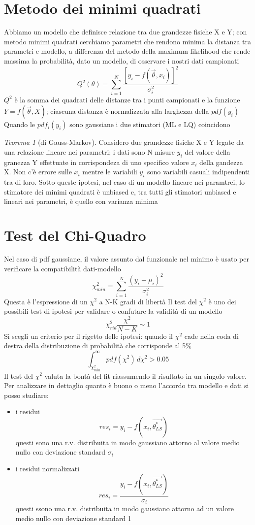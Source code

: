 \documentclass[12pt]{report}
\theoremstyle{remark}
\theoremstyle{theorem}
\newtheorem*{teo}{Teorema}
\begin{document}
\section{Metodo dei minimi quadrati}
Abbiamo un modello che definisce relazione tra due grandezze fisiche X e Y; con metodo minimi quadrati cerchiamo parametri che rendono minima la distanza tra parametri e modello, a differenza del metodo della maximum likelihood che rende massima la probabilità, dato un modello, di osservare i nostri dati campionati
\[Q^2(\theta) = \sum_{i=1}^N \frac{{[y_i - f(\vec{\theta},x_i)]}^2}{\sigma^2_i}\]
$Q^2$ è la somma dei quadrati delle distanze tra i punti campionati e la funzione $Y = f(\vec{\theta}, X)$; ciascuna distanza è normalizzata alla larghezza della $pdf(y_i)$ \newline
Quando le $pdf_i(y_i)$ sono gaussiane i due stimatori (ML e LQ) coincidono 
\begin{teo}[di Gauss-Markov]
	Considero due grandezze fisiche X e Y legate da una relazione lineare nei parametri; i dati sono N misure $y_i$ del valore della granezza Y effettuate in corrispondeza di uno specifico valore $x_i$ della gandezza X. Non c'è errore sulle $x_i$ mentre le variabili $y_i$ sono variabili casuali indipendenti tra di loro. \newline
	Sotto queste ipotesi, nel caso di un modello lineare nei paramtrei, lo stimatore dei minimi quadrati è unbiased e, tra tutti gli stimatori unbiased e lineari nei parametri, è quello con varianza minima
\end{teo}

\section{Test del Chi-Quadro}
Nel caso di pdf gaussiane, il valore assunto dal funzionale nel minimo è usato per verificare la compatibilità dati-modello
\[\chi^2_{min} = \sum_{i=1}^N \frac{{(y_i-\mu_i)}^2}{\sigma^2_i}\]
Questa è l'espressione di un $\chi^2$ a N-K gradi di libertà \newline
Il test del $\chi^2$ è uno dei possibili test di ipotesi per validare o confutare la validità di un modello
\[\chi^2_{rid} \frac{\chi^2}{N-K} \sim 1\]
Si scegli un criterio per il rigetto delle ipotesi: quando il $\chi^2$ cade nella coda di destra della distribuzione di probabilità che corrisponde al 5\% 
\[\int_{\chi^2_{min}}^\infty pdf(\chi^2)\, d\chi^2 > 0.05\]
Il test del $\chi^2$ valuta la bontà del fit riassumendo il risultato in un singolo valore. Per analizzare in dettaglio quanto è buono o meno l'accordo tra modello e dati si posso studiare:
\begin{itemize}
	\item i residui
		\[res_i = y_i - f(x_i,\vec{\theta^*_{LS}})\]
		questi sono una r.v. distribuita in modo gaussiano attorno al valore medio nullo con deviazione standard $\sigma_i$
	\item i residui normalizzati 
		\[res_i = \frac{y_i - f(x_i,\vec{\theta^*_{LS}})}{\sigma_i}\]
		questi ssono una r.v. distribuita in modo gaussiano attorno ad un valore medio nullo con deviazione standard 1
\end{itemize}
\end{document}
